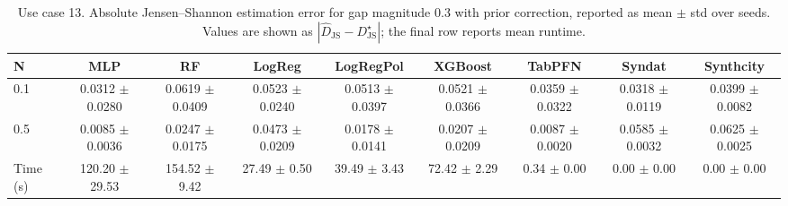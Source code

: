 \begin{table}[ht]
\centering
\scriptsize
\setlength{\tabcolsep}{2.5pt}
\caption{Use case 13. Absolute Jensen--Shannon estimation error for gap magnitude $0.3$ with prior correction, reported as mean $\pm$ std over seeds. Values are shown as $|\widehat{D}_{\mathrm{JS}} - D_{\mathrm{JS}}^{\star}|$; the final row reports mean runtime.}
\label{tab:uc13_gap_0p3_on_mean_std_from_seeds}
\begin{tabular}{lcccccccc}
\toprule
N & MLP & RF & LogReg & LogRegPol & XGBoost & TabPFN & Syndat & Synthcity \\
\midrule
0.1 & 0.0312 $\pm$ 0.0280 & 0.0619 $\pm$ 0.0409 & 0.0523 $\pm$ 0.0240 & 0.0513 $\pm$ 0.0397 & 0.0521 $\pm$ 0.0366 & 0.0359 $\pm$ 0.0322 & 0.0318 $\pm$ 0.0119 & 0.0399 $\pm$ 0.0082 \\
0.5 & 0.0085 $\pm$ 0.0036 & 0.0247 $\pm$ 0.0175 & 0.0473 $\pm$ 0.0209 & 0.0178 $\pm$ 0.0141 & 0.0207 $\pm$ 0.0209 & 0.0087 $\pm$ 0.0020 & 0.0585 $\pm$ 0.0032 & 0.0625 $\pm$ 0.0025 \\
Time (s) & 120.20 $\pm$ 29.53 & 154.52 $\pm$ 9.42 & 27.49 $\pm$ 0.50 & 39.49 $\pm$ 3.43 & 72.42 $\pm$ 2.29 & 0.34 $\pm$ 0.00 & 0.00 $\pm$ 0.00 & 0.00 $\pm$ 0.00 \\
\bottomrule
\end{tabular}
\end{table}